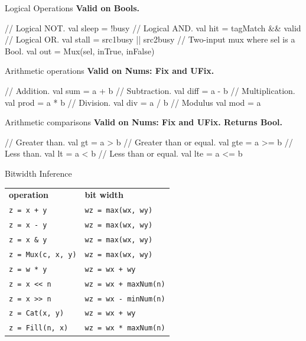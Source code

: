 \documentclass[xcolor=pdflatex,dvipsnames,table]{beamer}
\begin{document}
\begin{frame}[fragile]{Logical Operations}
\textbf{Valid on Bools. }
\begin{scala}
// Logical NOT. 
val sleep = !busy                     
// Logical AND.
val hit   = tagMatch && valid         
// Logical OR.
val stall = src1busy || src2busy      
// Two-input mux where sel is a Bool.  
val out   = Mux(sel, inTrue, inFalse) 
\end{scala}
\end{frame}

\begin{frame}[fragile]{Arithmetic operations}
\textbf{Valid on Nums: Fix and UFix. }
\begin{scala}
// Addition. 
val sum  = a + b  
// Subtraction.
val diff = a - b  
// Multiplication. 
val prod = a * b  
// Division.
val div  = a / b  
// Modulus
val mod  = a %
\end{scala}
\end{frame}

\begin{frame}[fragile]{Arithmetic comparisons}
\textbf{Valid on Nums: Fix and UFix. Returns Bool.}
\begin{scala}
// Greater than.
val gt  = a > b   
// Greater than or equal.
val gte = a >= b  
// Less than.
val lt  = a < b   
// Less than or equal.
val lte = a <= b  
\end{scala}
\end{frame}

\begin{frame}[fragile]{Bitwidth Inference}
\begin{center}
\begin{tabular}{ll}
{\bf operation} & {\bf bit width} \\ 
\verb|z = x + y| & \verb+wz = max(wx, wy)+ \\
\verb+z = x - y+ & \verb+wz = max(wx, wy)+\\
\verb+z = x & y+ & \verb+wz = max(wx, wy)+ \\
\verb+z = Mux(c, x, y)+ & \verb+wz = max(wx, wy)+ \\
\verb+z = w * y+ & \verb!wz = wx + wy! \\
\verb+z = x << n+ & \verb!wz = wx + maxNum(n)! \\
\verb+z = x >> n+ & \verb+wz = wx - minNum(n)+ \\
\verb+z = Cat(x, y)+ & \verb!wz = wx + wy! \\
\verb+z = Fill(n, x)+ & \verb+wz = wx * maxNum(n)+ \\
\end{tabular}
\end{center}
\end{frame}
\end{document}
